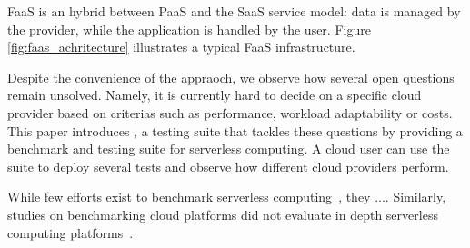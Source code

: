 \gls{FaaS} is an hybrid between \gls{PaaS} and the \gls{SaaS} service model:  data is managed by the provider, while the application is handled by the user. %
Figure \ref{fig:faas_achritecture} illustrates a typical \gls{FaaS} infrastructure.


Despite the convenience of the appraoch, we observe how several open questions remain unsolved. %
Namely, it is currently hard to decide on a specific cloud provider based on criterias such as performance, workload adaptability or costs.
This paper introduces \sys, a testing suite that tackles these questions by providing a benchmark and testing suite for serverless computing. 
A cloud user can use the suite to deploy several tests and observe how different cloud providers perform. %

While few efforts exist to benchmark serverless computing~\cite{doi:10.1002/cpe.4792, Kuntsevich:2018:DAB:3284014.3284016, EoPSCE, 10.1007/978-3-319-75178-8_34}, they .... 
Similarly, studies on benchmarking cloud platforms did not evaluate in depth serverless computing platforms~\cite{Gan:2019:OBS:3297858.3304013}. 
 
